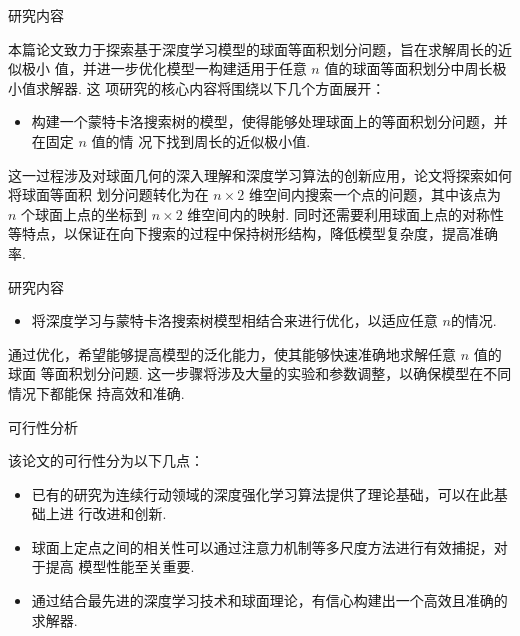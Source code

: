 \documentclass[12pt,aspectratio=169]{beamer}
\begin{document}
\begin{frame}{研究内容}

  本篇论文致力于探索基于深度学习模型的球面等面积划分问题，旨在求解{\color{ECNURed}周长的近似极小
  值}，并进一步优化模型一构建适用于{\color{ECNURed}任意 $n$ 值}的球面等面积划分中周长极小值求解器. 这
  项研究的核心内容将围绕以下几个方面展开：
  
  \begin{itemize}
    \item 构建一个蒙特卡洛搜索树的模型，使得能够处理球面上的等面积划分问题，并在{\color{ECNURed}固定 $n$ 值}的情
          况下找到周长的近似极小值. 
  \end{itemize}

  这一过程涉及对球面几何的深入理解和深度学习算法的创新应用，论文将探索如何将球面等面积
  划分问题转化为在 $n\times 2$ 维空间内搜索一个点的问题，其中该点为 $n$ 个球面上点的坐标到 $n\times 2$ 维空间内的映射. 
  同时还需要利用球面上点的对称性等特点，以保证在向下搜索的过程中保持树形结构，降低模型复杂度，提高准确率. 
\end{frame}

\begin{frame}{研究内容}

  \begin{itemize}
    \item 将深度学习与蒙特卡洛搜索树模型相结合来进行优化，以{\color{ECNURed}适应任意 $n$}的情况. 
  \end{itemize}

  通过优化，希望能够提高模型的泛化能力，使其能够快速准确地求解任意 $n$ 值的球面
  等面积划分问题. 这一步骤将涉及大量的实验和参数调整，以确保模型在不同情况下都能保
  持高效和准确. 

\end{frame}

\begin{frame}{可行性分析}

  该论文的可行性分为以下几点：

  \begin{itemize}
    \item 已有的研究为连续行动领域的深度强化学习算法提供了理论基础，可以在此基础上进
          行改进和创新. 

    \item 球面上定点之间的相关性可以通过注意力机制等多尺度方法进行有效捕捉，对于提高
          模型性能至关重要. 

    \item 通过结合最先进的深度学习技术和球面理论，有信心构建出一个高效且准确的求解器. 
  \end{itemize} 

\end{frame}
\end{document}
